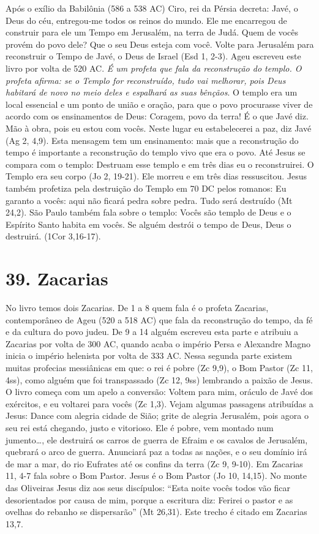 \documentclass[
]{book}
\begin{document}
Após o exílio da Babilônia (586 a 538 AC) Ciro, rei da Pérsia decreta: Javé, o Deus do céu, entregou-me todos os reinos do mundo. Ele me encarregou de construir para ele um Tempo em Jerusalém, na terra de Judá. Quem de vocês provém do povo dele? Que o seu Deus esteja com você. Volte para Jerusalém para reconstruir o Tempo de Javé, o Deus de Israel (Esd 1, 2-3). Ageu escreveu este livro por volta de 520 AC. \emph{É um profeta que fala da reconstrução do templo. O profeta afirma: se o Templo for reconstruído, tudo vai melhorar, pois Deus habitará de novo no meio deles e espalhará as suas bênçãos}. O templo era um local essencial e um ponto de união e oração, para que o povo procurasse viver de acordo com os ensinamentos de Deus: Coragem, povo da terra! É o que Javé diz. Mão à obra, pois eu estou com vocês. Neste lugar eu estabelecerei a paz, diz Javé (Ag 2, 4,9). Esta mensagem tem um ensinamento: mais que a reconstrução do tempo é importante a reconstrução do templo vivo que era o povo. Até Jesus se compara com o templo: Destruam esse templo e em três dias eu o reconstruirei. O Templo era seu corpo (Jo 2, 19-21). Ele morreu e em três dias ressuscitou. Jesus também profetiza pela destruição do Templo em 70 DC pelos romanos: Eu garanto a vocês: aqui não ficará pedra sobre pedra. Tudo será destruído (Mt 24,2). São Paulo também fala sobre o templo: Vocês são templo de Deus e o Espírito Santo habita em vocês. Se alguém destrói o tempo de Deus, Deus o destruirá. (1Cor 3,16-17).

\hypertarget{zacarias}{%
\section*{39. Zacarias}\label{zacarias}}

No livro temos dois Zacarias. De 1 a 8 quem fala é o profeta Zacarias, contemporâneo de Ageu (520 a 518 AC) que fala da reconstrução do tempo, da fé e da cultura do povo judeu. De 9 a 14 alguém escreveu esta parte e atribuiu a Zacarias por volta de 300 AC, quando acaba o império Persa e Alexandre Magno inicia o império helenista por volta de 333 AC. Nessa segunda parte existem muitas profecias messiânicas em que: o rei é pobre (Zc 9,9), o Bom Pastor (Zc 11, 4ss), como alguém que foi transpassado (Zc 12, 9ss) lembrando a paixão de Jesus. O livro começa com um apelo a conversão: Voltem para mim, oráculo de Javé dos exércitos, e eu voltarei para vocês (Zc 1,3). Vejam algumas passagens atribuídas a Jesus: Dance com alegria cidade de Sião; grite de alegria Jerusalém, pois agora o seu rei está chegando, justo e vitorioso. Ele é pobre, vem montado num jumento\ldots, ele destruirá os carros de guerra de Efraim e os cavalos de Jerusalém, quebrará o arco de guerra. Anunciará paz a todas as nações, e o seu domínio irá de mar a mar, do rio Eufrates até os confins da terra (Zc 9, 9-10). Em Zacarias 11, 4-7 fala sobre o Bom Pastor. Jesus é o Bom Pastor (Jo 10, 14,15). No monte das Oliveiras Jesus diz aos seus discípulos: ``Esta noite vocês todos vão ficar desorientados por causa de mim, porque a escritura diz: Ferirei o pastor e as ovelhas do rebanho se dispersarão'' (Mt 26,31). Este trecho é citado em Zacarias 13,7.
\end{document}
